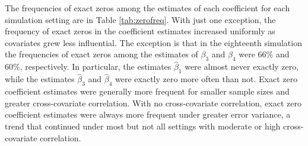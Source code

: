 \documentclass[authoryear,review, 12pt]{elsarticle}
\begin{document}
The frequencies of exact zeros among the estimates of each coefficient for each simulation setting are in Table \ref{tab:zerofreq}.
With just one exception, the frequency of exact zeros in the coefficient estimates increased uniformly as covariates grew less influential.
The exception is that in the eighteenth simulation the frequencies of exact zeros among the estimates of $\beta_3$ and $\beta_4$ were $66\%$ and $60\%$, respectively.
In particular, the estimates $\hat{\beta}_1$ were almost never exactly zero, while the estimates $\hat{\beta}_3$ and $\hat{\beta}_4$ were exactly zero more often than not.
Exact zero coefficient estimates were generally more frequent for smaller sample sizes and greater cross-covariate correlation. 
With no cross-covariate correlation, exact zero coefficient estimates were always more frequent under greater error variance, a trend that continued under most but not all settings with moderate or high cross-covariate correlation.
\end{document}
